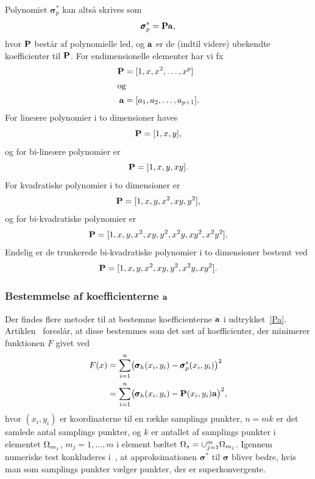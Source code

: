 Polynomiet $\pmb{\sigma}^{\ast}_p$ kan altså skrives som
\begin{equation} \label{Pa}
  \pmb{\sigma}^{\ast}_p = {\bf Pa},
\end{equation}
hvor ${\bf P}$ består af polynomielle led, og ${\bf a}$ er de (indtil
videre) ubekendte koefficienter til ${\bf P}$. For endimensionelle
elementer har vi fx
\begin{align}
  {\bf P} &= [1,x,x^2,\ldots,x^p] \\
\intertext{og}
  {\bf a} &= [a_1,a_2,\ldots,a_{p+1}].
\end{align}
For lineære polynomier i to dimensioner haves
\begin{equation}
  {\bf P} = [1,x,y],
\end{equation}
og for bi-lineære polynomier er
\begin{equation}
  {\bf P} = [1,x,y,xy].
\end{equation}
For kvadratiske polynomier i to dimensioner er
\begin{equation}
  {\bf P} = [1,x,y,x^2,xy,y^2],
\end{equation}
og for bi-kvadratiske polynomier er
\begin{equation}
  {\bf P} = [1,x,y,x^2,xy,y^2,x^2y,xy^2,x^2y^2].
\end{equation}
Endelig er de trunkerede bi-kvadratiske polynomier i to dimensioner
bestemt ved
\begin{equation}
  {\bf P} = [1,x,y,x^2,xy,y^2,x^2y,xy^2].
\end{equation}
\subsubsection{Bestemmelse af koefficienterne ${\bf a}$}
Der findes flere metoder til at bestemme koefficienterne ${\bf a}$ i
udtrykket~\eqref{Pa}. Artiklen~\cite{zz3} foreslår, at disse bestemmes
som det sæt af koefficienter, der minimerer funktionen $F$ givet ved
\begin{align}
  F(x) &= \sum_{i=1}^n \bigl( \pmb{\sigma}_h (x_i,y_i) -
    \pmb{\sigma}^{\ast}_p (x_i,y_i) \bigr)^2 \\
  &= \sum_{i=1}^n \bigl( \pmb{\sigma}_h (x_i,y_i) -
    {\bf P}(x_i,y_i){\bf a} \bigr)^2, \notag
\end{align}
hvor $(x_i,y_i)$ er koordinaterne til en række samplings punkter, $n=mk$
er det samlede antal samplings punkter, og $k$ er antallet af samplings
punkter i elementet $\Omega_{m_j}$, $m_j=1,\ldots,m$ i element bæltet
$\Omega_s=\cup_{j=1}^m \Omega_{m_j}$. Igennem numeriske test konkluderes
i~\cite{zz3}, at approksimationen $\pmb{\sigma}^{\ast}$ til
$\pmb\sigma$ bliver bedre, hvis man som samplings punkter vælger punkter,
der er superkonvergente. 

